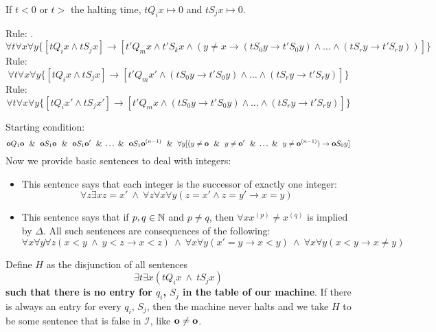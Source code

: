 If $t<0$ or $t>$ the halting time, $tQ_ix \mapsto 0$ and $tS_jx\mapsto 0$.

Rule: .
\begin{equation}\label{writeTapeEdge}
\forall t\forall x\forall y \{[tQ_ix\land  tS_jx] \rightarrow [t'Q_mx\land  t'S_kx \land  (y\ne x \rightarrow (tS_0y\rightarrow t'S_0y)\land \dots\land (tS_ry\rightarrow t'S_ry))]\}
\end{equation}
Rule: 
\begin{equation}
\forall t\forall x\forall y\{[tQ_ix\land tS_jx]\rightarrow [t'Q_mx' \land  (tS_0y\rightarrow t'S_0y)\land \dots\land (tS_ry\rightarrow t'S_ry)]\}
\end{equation}
Rule: 
\begin{equation}
\forall t \forall x \forall y \{[tQ_ix' \land  tS_jx']\rightarrow [t'Q_mx\land  (tS_0y\rightarrow t'S_0y)\land \dots\land (tS_ry\rightarrow t'S_ry)]\}
\end{equation}

Starting condition:
\begin{equation}
\label{descOfZero}
\mathbf{o} Q_1 \mathbf{o}\ ~\&~ \ \mathbf{o} S_1\mathbf{o}\ ~\&~ \ \mathbf{o} S_1\mathbf{o} '\ ~\&~ \dots~\&~ \ \mathbf{o} S_1\mathbf{o}^{(n-1)}\ ~\&~ \ \forall y [(y\ne \mathbf{o}\ ~\&~ \ y\ne \mathbf{o}'\ ~\&~ \dots~\&~ \ y\ne \mathbf{o}^{(n-1)}) \rightarrow \mathbf{o} S_0y]
\end{equation}
Now we provide basic sentences to deal with integers:
\begin{itemize}
\item This sentence says that each integer is the successor of exactly one integer:
\begin{equation}\label{successorOfOneOther}
\forall z\exists x z = x'\ \land  \ \forall z\forall x\forall y (z=x'\land z=y'\rightarrow x=y)
\end{equation}
\item This sentence says that if $p,q\in\mathbb{N}$ and $p\ne q$, then $\forall x x^{(p)}\ne x^{(q)}$ is implied by $\Delta$. All such sentences are consequences of the following:
\begin{equation}\label{additionWorks}
\forall x\forall y\forall z (x < y\ \land \ y < z\rightarrow x<z)\ \land \ \forall x\forall y(x'=y\rightarrow x<y)\ \land \ \forall x\forall y(x<y\rightarrow x\ne y)
\end{equation}
\end{itemize}

Define $H$ as the disjunction of all sentences
\[\exists t\exists x (tQ_i x\ \land \ tS_jx)\]
\textbf{such that there is no entry for $q_i$, $S_j$ in the table of our machine}. If there is always an entry for every $q_i$, $S_j$, then the machine never halts and we take $H$ to be some sentence that is false in $\mathscr{I}$, like $\mathbf{o}\ne \mathbf{o}$.
